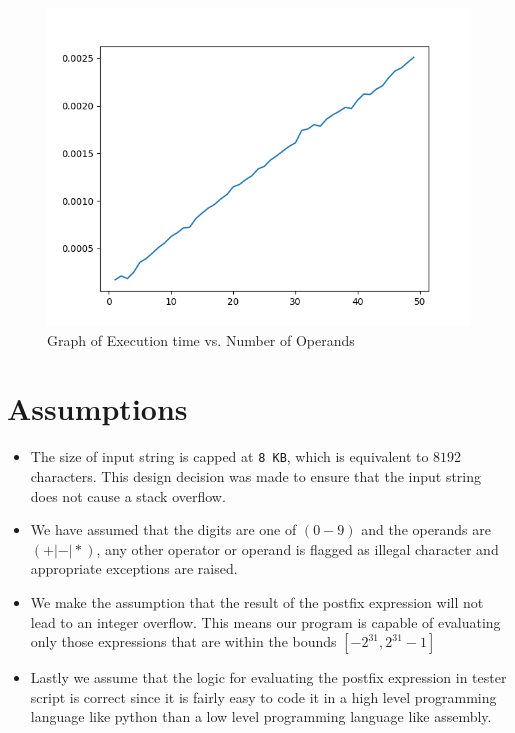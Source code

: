 \documentclass[hidelinks,12pt]{article}
\begin{document}
\begin{figure}[h!]
    \includegraphics[width=\linewidth]{timing.png}
    \caption{Graph of Execution time vs. Number of Operands}
    \label{fig:boat1}
\end{figure}

\section{Assumptions}
\begin{itemize}
    \item The size of input string is capped at \verb|8 KB|, which is equivalent to $8192$ characters. This design decision was made to ensure that the input string does not cause a stack overflow.
    \item We have assumed that the digits are one of $(0-9)$ and the operands are $(+|-|*)$, any other operator or operand is flagged as illegal character and appropriate exceptions are raised.
    \item We make the assumption that the result of the postfix expression will not lead to an integer overflow. This means our program is capable of evaluating only those expressions that are within the bounds $[-2^{31}, 2^{31}-1]$
    \item Lastly we assume that the logic for evaluating the postfix expression in tester script is correct since it is fairly easy to code it in a high level programming language like python than a low level programming language like assembly.
\end{itemize}
\end{document}
